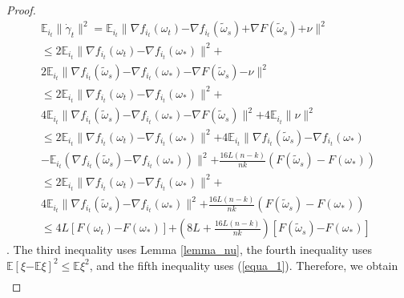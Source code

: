 \documentclass[letterpaper]{article}
\begin{document}
\begin{proof}
\begin{equation}
\begin{array}{ll}
\mathbb{E}_{i_t}\parallel  \dot{\gamma}_{t} \parallel^2  
= \mathbb{E}_{i_t} \parallel \nabla f_{i_{t}}(\omega_{t}) \mathrm{-} \nabla f_{i_{t}}(\tilde{\omega}_s)  \mathrm{+} \nabla F(\tilde{\omega}_s) \mathrm{+} \nu \parallel^2\\
\le 2\mathbb{E}_{i_t} \parallel \nabla f_{i_{t}}(\omega_{t}) \mathrm{-} \nabla f_{i_{t}}(\omega_{\ast}) \parallel^2 \mathrm{+}\\
 2 \mathbb{E}_{i_t} \parallel  \nabla f_{i_{t}}(\tilde{\omega}_{s}) \mathrm{-} \nabla f_{i_{t}}(\omega_{\ast}) \mathrm{-} \nabla F(\tilde{\omega}_s)   \mathrm{-} \nu  \parallel^2  \\
\le 2\mathbb{E}_{i_t} \parallel \nabla f_{i_{t}}(\omega_{t}) \mathrm{-} \nabla f_{i_{t}}(\omega_{\ast}) \parallel^2  \mathrm{+} \\
4 \mathbb{E}_{i_t} \parallel  \nabla f_{i_{t}}(\tilde{\omega}_{s}) \mathrm{-} \nabla f_{i_{t}}(\omega_{\ast}) \mathrm{-} \nabla F(\tilde{\omega}_s) \parallel^2 \mathrm{+} 4\mathbb{E}_{i_t} \parallel \nu  \parallel^2 \\ 
\le 2\mathbb{E}_{i_t} \parallel \nabla f_{i_{t}}(\omega_{t}) \mathrm{-} \nabla f_{i_{t}}(\omega_{\ast}) \parallel^2  \mathrm{+} 4 \mathbb{E}_{i_t} \parallel  \nabla f_{i_{t}}(\tilde{\omega}_{s}) \mathrm{-} \nabla f_{i_{t}}(\omega_{\ast}) \\
\mathrm{-} \mathbb{E}_{i_t} \left ( \nabla f_{i_t}(\tilde{\omega}_s) \mathrm{-} \nabla f_{i_t}(\omega_\ast)   \right)\parallel^2   \mathrm{+} \frac{16L(n-k)}{nk} ( F(\tilde{\omega}_s) - F(\omega_\ast))    \\ 
\le 2\mathbb{E}_{i_t} \parallel \nabla f_{i_{t}}(\omega_{t}) \mathrm{-} \nabla f_{i_{t}}(\omega_{\ast}) \parallel^2  \mathrm{+} \\
4 \mathbb{E}_{i_t} \parallel  \nabla f_{i_{t}}(\tilde{\omega}_{s}) \mathrm{-} \nabla f_{i_{t}}(\omega_{\ast}) \parallel^2 \mathrm{+} \frac{16L(n-k)}{nk} ( F(\tilde{\omega}_s) - F(\omega_\ast))\\
\le 4L [F(\omega_t)\mathrm{-}F(\omega_\ast)] \mathrm{+} \left( 8L+ \frac{16L(n-k)}{nk}\right) [F(\tilde{\omega}_s)\mathrm{-}F(\omega_\ast)]
\end{array} 
\end{equation}.  The third inequality uses Lemma \ref{lemma_nu},  the fourth inequality uses $\mathbb{E}[\xi\mathrm{-}\mathbb{E}\xi]^2 \le \mathbb{E}\xi^2$, and the fifth inequality uses (\ref{equa_1}). Therefore, we obtain 
\begin{equation}
\begin{array}{ll}

\end{array}
\end{equation}
\end{proof}
\end{document}
